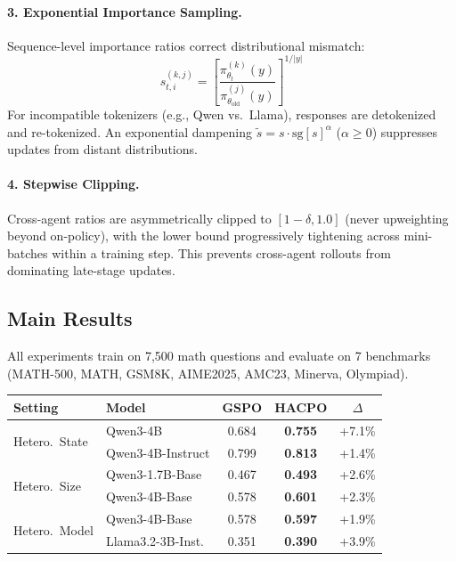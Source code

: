 \documentclass[11pt]{article}
\begin{document}
\paragraph{3. Exponential Importance Sampling.} Sequence-level importance ratios correct distributional mismatch:
\begin{equation}
    s_{t,i}^{(k,j)} = \left[\frac{\pi_{\theta_t}^{(k)}(y)}{\pi_{\theta_{\text{old}}}^{(j)}(y)}\right]^{1/|y|}
\end{equation}
For incompatible tokenizers (e.g., Qwen vs.\ Llama), responses are detokenized and re-tokenized. An exponential dampening $\tilde{s} = s \cdot \text{sg}[s]^\alpha$ ($\alpha \geq 0$) suppresses updates from distant distributions.

\paragraph{4. Stepwise Clipping.} Cross-agent ratios are asymmetrically clipped to $[1{-}\delta, 1.0]$ (never upweighting beyond on-policy), with the lower bound progressively tightening across mini-batches within a training step. This prevents cross-agent rollouts from dominating late-stage updates.

\subsection{Main Results}

All experiments train on 7,500 math questions and evaluate on 7 benchmarks (MATH-500, MATH, GSM8K, AIME2025, AMC23, Minerva, Olympiad).

\begin{table}[h]
\centering
\begin{tabular}{llccc}
\toprule
\textbf{Setting} & \textbf{Model} & \textbf{GSPO} & \textbf{HACPO} & \textbf{$\Delta$} \\
\midrule
\multirow{2}{*}{Hetero.\ State} & Qwen3-4B & 0.684 & \textbf{0.755} & +7.1\% \\
& Qwen3-4B-Instruct & 0.799 & \textbf{0.813} & +1.4\% \\
\midrule
\multirow{2}{*}{Hetero.\ Size} & Qwen3-1.7B-Base & 0.467 & \textbf{0.493} & +2.6\% \\
& Qwen3-4B-Base & 0.578 & \textbf{0.601} & +2.3\% \\
\midrule
\multirow{2}{*}{Hetero.\ Model} & Qwen3-4B-Base & 0.578 & \textbf{0.597} & +1.9\% \\
& Llama3.2-3B-Inst. & 0.351 & \textbf{0.390} & +3.9\% \\
\bottomrule
\end{tabular}
\end{table}
\end{document}
